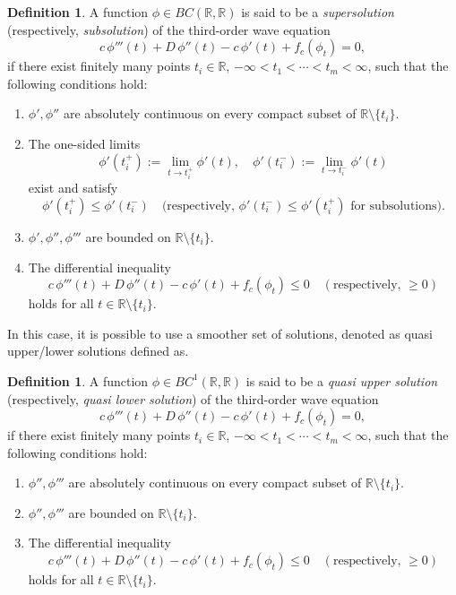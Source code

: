 \documentclass[12pt,letterpaper]{amsart}
\theoremstyle{definition}
\newtheorem{definition}[theorem]{Definition}
\theoremstyle{remark}
\numberwithin{equation}{section}
\begin{document}
\begin{definition}
	A function $\phi \in BC(\mathbb{R}, \mathbb{R})$ is said to be a 
	\emph{supersolution} (respectively, \emph{subsolution}) 
	of the third-order wave equation
	\[
	c\,\phi'''(t) + D\,\phi''(t) - c\,\phi'(t) + f_c(\phi_t) = 0,
	\]
	if there exist finitely many points $t_i \in \mathbb{R}$, 
	$-\infty < t_1 < \cdots < t_m < \infty$, such that the following conditions hold:
	\begin{enumerate}
		\item[\textnormal{(i)}] 
		$\phi', \phi''$ are absolutely continuous on every compact subset of 
		$\mathbb{R} \setminus \{t_i\}$.
		
		\item[\textnormal{(ii)}] 
		The one-sided limits 
		\[
		\phi'(t_i^+) := \lim_{t \to t_i^+} \phi'(t), 
		\quad 
		\phi'(t_i^-) := \lim_{t \to t_i^-} \phi'(t)
		\]
		exist and satisfy
		\[
		\phi'(t_i^+) \le \phi'(t_i^-)
		\quad 
		\text{(respectively, } \phi'(t_i^-) \le \phi'(t_i^+)
		\text{ for subsolutions)}.
		\]
		
		\item[\textnormal{(iii)}] 
		$\phi', \phi'', \phi'''$ are bounded on $\mathbb{R}\setminus\{t_i\}$.
		
		\item[\textnormal{(iv)}] 
		The differential inequality
		\[
		c\,\phi'''(t) + D\,\phi''(t) - c\,\phi'(t) + f_c(\phi_t) \le 0
		\quad 
		(\text{respectively, } \ge 0)
		\]
		holds for all $t \in \mathbb{R} \setminus \{t_i\}$.
	\end{enumerate}
\end{definition}



In this case, it is possible to use a smoother set of solutions, denoted as quasi upper/lower solutions defined as. 
\begin{definition}
	A function $\phi \in BC^1(\mathbb{R}, \mathbb{R})$ is said to be a 
	\emph{quasi upper solution} (respectively, \emph{quasi lower solution}) 
	of the third-order wave equation
	\[
	c\,\phi'''(t) + D\,\phi''(t) - c\,\phi'(t) + f_c(\phi_t) = 0,
	\]
	if there exist finitely many points $t_i \in \mathbb{R}$, 
	$-\infty < t_1 < \cdots < t_m < \infty$, such that the following conditions hold:
	\begin{enumerate}
		\item[\textnormal{(i)}] 
		$\phi'', \phi'''$ are absolutely continuous on every compact subset of 
		$\mathbb{R} \setminus \{t_i\}$.		
		\item[\textnormal{(ii)}] 
		$ \phi'', \phi'''$ are bounded on $\mathbb{R}\setminus\{t_i\}$.
		
		\item[\textnormal{(iii)}] 
		The differential inequality
		\[
		c\,\phi'''(t) + D\,\phi''(t) - c\,\phi'(t) + f_c(\phi_t) \le 0
		\quad 
		(\text{respectively, } \ge 0)
		\]
		holds for all $t \in \mathbb{R} \setminus \{t_i\}$.
	\end{enumerate}
\end{definition}
\end{document}
